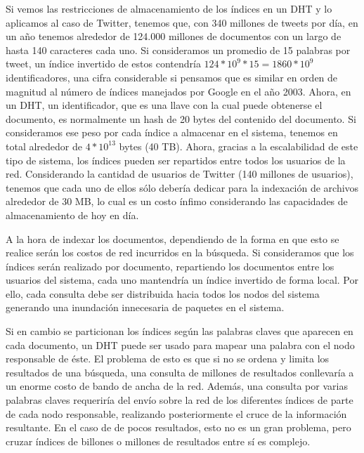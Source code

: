     Si vemos las restricciones de almacenamiento de los índices en un DHT y lo
    aplicamos al caso de Twitter, tenemos que, con
    340 millones de tweets por día, en un año tenemos alrededor de 124.000 millones de
    documentos con un largo de hasta 140 caracteres cada uno. Si consideramos
    un promedio de 15 palabras por tweet, un índice invertido de estos
    contendría $124 * 10^9 * 15 = 1860 * 10^9$ identificadores, una cifra
    considerable si pensamos que es similar en orden de magnitud al número de
    índices manejados por Google en el año 2003.
    Ahora, en un DHT, un identificador, que es una llave con la cual puede
    obtenerse el documento, es normalmente un hash de 20 bytes del contenido del
    documento.
    Si consideramos ese peso por cada índice a almacenar en el sistema,
    tenemos en total alrededor de $4 * 10^{13}$  bytes (40 TB). Ahora, gracias
    a la escalabilidad de este tipo de sistema, los índices pueden ser repartidos
    entre todos los usuarios de la red. Considerando la cantidad de usuarios de
    Twitter (140 millones de usuarios), tenemos que cada uno de ellos sólo
    debería dedicar para la indexación de archivos  alrededor de 30 MB, lo cual
    es un costo ínfimo considerando las capacidades de almacenamiento de hoy en
    día.

    A la hora de indexar los documentos, dependiendo de la forma en
    que esto se realice serán los costos de red incurridos en la búsqueda.
    Si consideramos que los índices serán realizado por documento, repartiendo
    los documentos entre los usuarios del sistema, cada uno mantendría un índice
    invertido de forma local. Por ello, cada consulta debe ser distribuida
    hacia todos los nodos del sistema generando una inundación innecesaria de paquetes en el sistema.
    
    Si en cambio se particionan los índices según las palabras claves que
    aparecen en cada documento, un DHT puede ser usado para mapear una palabra
    con el nodo responsable de éste.
    El problema de esto es que si no se ordena y limita los resultados de una búsqueda, una consulta de millones de resultados conllevaría a un enorme
    costo de bando de ancha de la red. Además, una consulta por varias palabras
    claves requeriría del envío sobre la red de los diferentes índices de parte
    de cada nodo responsable, realizando posteriormente el cruce  de la
    información resultante. En el caso de de pocos resultados, esto no es un
    gran problema, pero cruzar índices de billones o millones de resultados entre
    sí es complejo.


